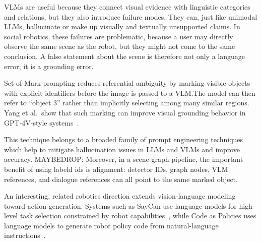 VLMs are useful because they connect visual evidence with linguistic categories and relations, but they also introduce failure modes. They can, just like unimodal LLMs, hallucinate or make up visually and textually unsupported claims. In social robotics, these failures are problematic, because a user may directly observe the same scene as the robot, but they might not come to the same conclusion. A false statement about the scene is therefore not only a language error; it is a grounding error.

Set-of-Mark prompting reduces referential ambiguity by marking visible objects with explicit identifiers before the image is passed to a VLM.\@ The model can then refer to \enquote{object 3} rather than implicitly selecting among many similar regions. Yang et al.\ show that such marking can improve visual grounding behavior in GPT-4V-style systems~\cite{yang_set-of-mark_2023}.

This technique belongs to a broaded family of prompt engineering techniques which help to mitigate hallucination issues in LLMs and VLMs and improve accuracy. MAYBEDROP: Moreover, in a scene-graph pipeline, the important benefit of using labeld ids is alignment: detector IDs, graph nodes, VLM references, and dialogue references can all point to the same marked object.




An interesting, related robotics direction extends vision-language modeling toward action generation. Systems such as SayCan use language models for high-level task selection constrained by robot capabilities~\cite{ahn_as_2022}, while Code as Policies uses language models to generate robot policy code from natural-language instructions~\cite{liang_code_2023}.

